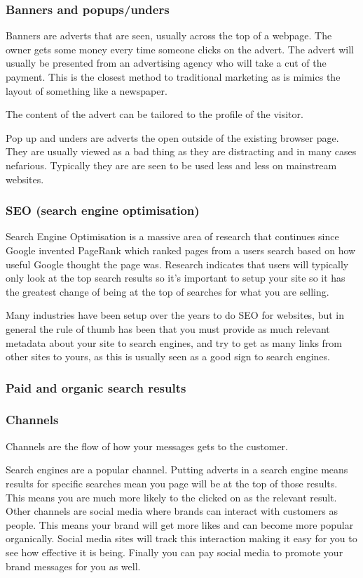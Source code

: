 \documentclass{article}
\begin{document}
\subsubsection{Banners and popups/unders}
Banners are adverts that are seen, usually across the top of a webpage. The owner gets some money every time someone clicks on the advert. The advert will usually be presented from an advertising agency who will take a cut of the payment.
This is the closest method to traditional marketing as is mimics the layout of something like a newspaper.

The content of the advert can be tailored to the profile of the visitor.

Pop up and unders are adverts the open outside of the existing browser page. They are usually viewed as a bad thing as they are distracting and in many cases nefarious. Typically they are are seen to be used less and less on mainstream websites.

\subsubsection{SEO (search engine optimisation)}
Search Engine Optimisation is a massive area of research that continues since Google invented PageRank which ranked pages from a users search based on how useful Google thought the page was.
Research indicates that users will typically only look at the top search results so it's important to setup your site so it has the greatest change of being at the top of searches for what you are selling.

Many industries have been setup over the years to do SEO for websites, but in general the rule of thumb has been that you must provide as much relevant metadata about your site to search engines, and try to get as many links from other sites to yours, as this is usually seen as a good sign to search engines.

\subsubsection{Paid and organic search results}

\subsubsection{Channels}
Channels are the flow of how your messages gets to the customer.

Search engines are a popular channel. Putting adverts in a search engine means results for specific searches mean you page will be at the top of those results. This means you are much more likely to the clicked on as the relevant result.
Other channels are social media where brands can interact with customers as people. This means your brand will get more likes and can become more popular organically. Social media sites will track this interaction making it easy for you to see how effective it is being.
Finally you can pay social media to promote your brand messages for you as well.
\end{document}
